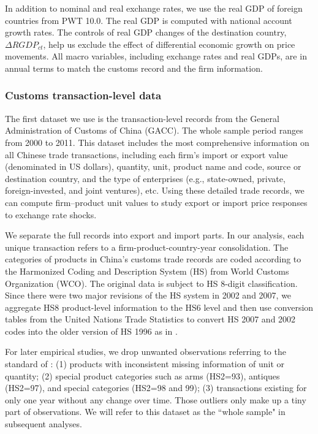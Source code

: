 \documentclass[12pt]{article}
\begin{document}
In addition to nominal and real exchange rates, we use the real GDP of foreign countries from PWT 10.0. The real GDP is computed with national account growth rates. The controls of real GDP changes of the destination country, $\Delta RGDP_{ct}$, help us exclude the effect of differential economic growth on price movements. All macro variables, including exchange rates and real GDPs, are in annual terms to match the customs record and the firm information.

\subsubsection{Customs transaction-level data} \label{Data-Customs}

The first dataset we use is the transaction-level records from the General Administration of Customs of China (GACC). The whole sample period ranges from 2000 to 2011. This dataset includes the most comprehensive information on all Chinese trade transactions, including each firm's import or export value (denominated in US dollars), quantity, unit, product name and code, source or destination country, and the type of enterprises (e.g., state-owned, private, foreign-invested, and joint ventures), etc. Using these detailed trade records, we can compute firm–product unit values to study export or import price responses to exchange rate shocks. 

We separate the full records into export and import parts. In our analysis, each unique transaction refers to a firm-product-country-year consolidation. The categories of products in China's customs trade records are coded according to the Harmonized Coding and Description System (HS) from World Customs Organization (WCO). The original data is subject to HS 8-digit classification. Since there were two major revisions of the HS system in 2002 and 2007, we aggregate HS8 product-level information to the HS6 level and then use conversion tables from the United Nations Trade Statistics to convert HS 2007 and 2002 codes into the older version of HS 1996 as in \cite{fan-li-yeaple2015}.

For later empirical studies, we drop unwanted observations referring to the standard of \cite{lmx2015}: (1) products with inconsistent missing information of unit or quantity; (2) special product categories such as arms (HS2=93), antiques (HS2=97), and special categories (HS2=98 and 99); (3) transactions existing for only one year without any change over time. Those outliers only make up a tiny part of observations. We will refer to this dataset as the ``whole sample" in subsequent analyses.
\end{document}
